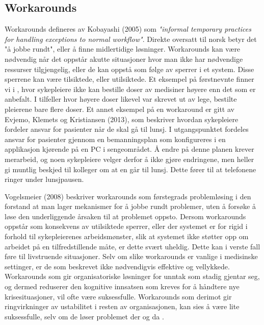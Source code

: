 \subsection{Workarounds}
\label{chp: workarounds}

Workarounds defineres av Kobayashi (2005) som \emph{"informal temporary practices for handling exceptions to normal workflow"}. Direkte oversatt til norsk betyr det "å jobbe rundt", eller å finne midlertidige løsninger.
\noindent
Workarounds kan være nødvendig når det oppstår akutte situasjoner hvor man ikke har nødvendige ressurser tilgjengelig, eller de kan oppstå som følge av sperrer i et system. Disse sperrene kan være tilsiktede, eller utilsiktede. Et eksempel på førstnevnte finner vi i \cite{Vogelsmeier08}, hvor sykepleiere ikke kan bestille doser av medisiner høyere enn det som er anbefalt. I tilfeller hvor høyere doser likevel var skrevet ut av lege, bestilte pleierene bare flere doser. 
Et annet eksempel på en workaround er gitt av Evjemo, Klemets og Kristiansen (2013), som beskriver hvordan sykepleiere fordeler ansvar for pasienter når de skal gå til lunsj. I utgangspunktet fordeles ansvar for pasienter gjennom en bemanningsplan som konfigureres i en applikasjon kjørende på en PC i sengeområdet. Å endre på denne planen krever merarbeid, og noen sykepleiere velger derfor å ikke gjøre endringene, men heller gi muntlig beskjed til kolleger om at en går til lunsj. Dette fører til at telefonene ringer under lunsjpausen.

\noindent
Vogelsmeier (2008) beskriver workarounds som førstegrads problemløsing i den forstand at man lager mekanismer for å jobbe rundt problemer, uten å forsøke å løse den underliggende årsaken til at problemet oppsto.
Dersom workarounds oppstår som konsekvens av utilsiktede sperrer, eller der systemet er for rigid i forhold til sykepleierenes arbeidsmønster, slik at systemet ikke støtter opp om arbeidet på en tilfredstillende måte, er dette svært uheldig. Dette kan i verste fall føre til livstruende situasjoner.
Selv om slike workarounds er vanlige i medisinske settinger, er de som beskrevet ikke nødvendigvis effektive og vellykkede. Workarounds som gir organisatoriske løsninger for unntak som stadig gjentar seg, og dermed reduserer den kognitive innsatsen som kreves for å håndtere nye krisesituasjoner, vil ofte være suksessfulle. Workarounds som derimot gir ringvirkninger av ustabilitet i resten av organisasjonen, kan sies å være lite suksessfulle, selv om de løser problemet der og da \cite{Kobayashi05}.